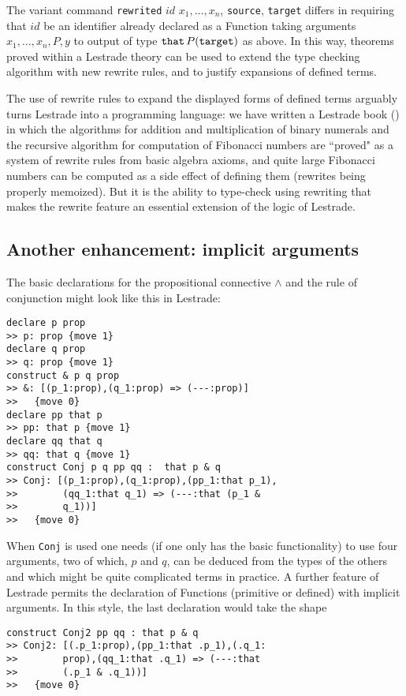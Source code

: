 \documentclass{article}
\begin{document}
The variant command  {\tt rewrited} $id$ $x_1, \ldots, x_n$, {\tt source}, {\tt target} differs in requiring that $id$ be an identifier already declared as a Function taking arguments $x_1,\ldots,x_n,P,y$ to output of type ${\tt that}\, P({\tt target})$ as above.  In this way, theorems proved within a Lestrade theory can be used to extend the type checking algorithm with new rewrite rules, and to justify expansions of defined terms.

The use of rewrite rules to expand the displayed forms of defined terms arguably turns Lestrade into a programming language:  we have written a Lestrade book (\cite{fibonacci}) in which the algorithms for addition and multiplication of binary numerals and the recursive algorithm for computation of Fibonacci numbers are ``proved" as a system of rewrite rules from basic algebra axioms, and quite large Fibonacci numbers can be computed as a side effect of defining them (rewrites being properly memoized).  But it is the ability to type-check using rewriting that makes the rewrite feature an essential extension of the logic of Lestrade.

\subsection{Another enhancement:  implicit arguments}

The basic declarations for the propositional connective $\wedge$ and the rule of conjunction might look like this in Lestrade:

\begin{verbatim}
declare p prop
>> p: prop {move 1}
declare q prop
>> q: prop {move 1}
construct & p q prop
>> &: [(p_1:prop),(q_1:prop) => (---:prop)]
>>   {move 0}
declare pp that p
>> pp: that p {move 1}
declare qq that q
>> qq: that q {move 1}
construct Conj p q pp qq :  that p & q
>> Conj: [(p_1:prop),(q_1:prop),(pp_1:that p_1),
>>        (qq_1:that q_1) => (---:that (p_1 & 
>>        q_1))]
>>   {move 0}
\end{verbatim}

When {\tt Conj} is used one needs (if one only has the basic functionality) to use four arguments, two of which,
$p$ and $q$, can be deduced from the types of the others and which might be quite complicated terms in practice.  A further feature of Lestrade permits the declaration of Functions (primitive or defined) with implicit arguments.  In this style, the last declaration would take the shape

\begin{verbatim}
construct Conj2 pp qq : that p & q
>> Conj2: [(.p_1:prop),(pp_1:that .p_1),(.q_1:
>>        prop),(qq_1:that .q_1) => (---:that 
>>        (.p_1 & .q_1))]
>>   {move 0}
\end{verbatim}
\end{document}
